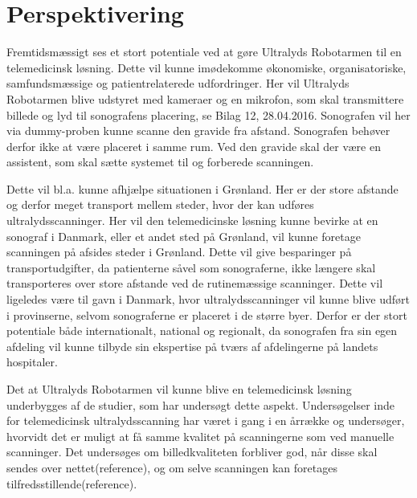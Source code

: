 \chapter{Perspektivering}
Fremtidsmæssigt ses et stort potentiale ved at gøre Ultralyds Robotarmen til en telemedicinsk løsning. Dette vil kunne imødekomme økonomiske, organisatoriske, samfundsmæssige og patientrelaterede
udfordringer. Her vil Ultralyds Robotarmen blive udstyret med kameraer og en mikrofon, som skal transmittere billede og lyd til sonografens placering, se Bilag 12, 28.04.2016. Sonografen vil her via dummy-proben kunne scanne den gravide fra afstand. Sonografen behøver derfor ikke at være placeret i samme rum. Ved den gravide skal der være en assistent, som skal sætte systemet til og forberede scanningen.
 
Dette vil bl.a. kunne afhjælpe situationen i Grønland. Her er der store afstande og derfor meget transport mellem steder, hvor der kan udføres ultralydsscanninger. Her vil den telemedicinske løsning kunne bevirke at en sonograf i Danmark, eller et andet sted på Grønland, vil kunne foretage scanningen på afsides steder i Grønland. Dette vil give besparinger på transportudgifter, da patienterne såvel som sonograferne, ikke længere skal transporteres over store afstande ved de rutinemæssige scanninger. 
Dette vil ligeledes være til gavn i Danmark, hvor ultralydsscanninger vil kunne blive udført i provinserne, selvom sonograferne er placeret i de større byer.
Derfor er der stort potentiale både internationalt, national og regionalt, da sonografen fra sin egen afdeling vil kunne tilbyde sin ekspertise på tværs af afdelingerne på landets hospitaler. 

Det at Ultralyds Robotarmen vil kunne blive en telemedicinsk løsning underbygges af de studier, som har undersøgt dette aspekt. Undersøgelser inde for telemedicinsk ultralydsscanning har været i gang i en årrække og undersøger, hvorvidt det er muligt at få samme kvalitet på scanningerne som ved manuelle scanninger. Det undersøges om billedkvaliteten forbliver god, når disse skal sendes over nettet(reference), og om selve scanningen kan foretages tilfredsstillende(reference). 

